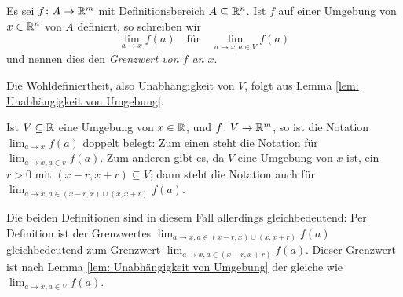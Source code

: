 \documentclass[a4paper,10pt]{article}
\begin{document}
\begin{defi}
 Es sei $f \colon A \to \mathbb{R}^m$ mit Definitionsbereich $A \subseteq \mathbb{R}^n$. Ist $f$ auf einer Umgebung von $x \in \mathbb{R}^n$ von $A$ definiert, so schreiben wir
 \[
  \lim_{a \to x} f(a)
  \quad
  \text{für}
  \quad
  \lim_{a \to x, a \in V} f(a)
 \]
 und nennen dies den \emph{Grenzwert von $f$ an $x$}.
\end{defi}


Die Wohldefiniertheit, also Unabhängigkeit von $V$, folgt aus Lemma \ref{lem: Unabhängigkeit von Umgebung}.


\begin{bem}
 Ist $V \subseteq \mathbb{R}$ eine Umgebung von $x \in \mathbb{R}$, und $f \colon V \to \mathbb{R}^m$, so ist die Notation $\lim_{a \to x} f(a)$ doppelt belegt: Zum einen steht die Notation für $\lim_{a \to x, a \in v} f(a)$. Zum anderen gibt es, da $V$ eine Umgebung von $x$ ist, ein $r > 0$ mit $(x-r,x+r) \subseteq V$; dann steht die Notation auch für $\lim_{a \to x, a \in (x-r,x) \cup (x,x+r)} f(a)$.
 
 Die beiden Definitionen sind in diesem Fall allerdings gleichbedeutend: Per Definition ist der Grenzwertes $\lim_{a \to x, a \in (x-r,x) \cup (x,x+r)} f(a)$ gleichbedeutend zum Grenzwert $\lim_{a \to x, a \in (x-r,x+r)} f(a)$. Dieser Grenzwert ist nach Lemma \ref{lem: Unabhängigkeit von Umgebung} der gleiche wie $\lim_{a \to x, a \in V} f(a)$.
\end{bem}
\end{document}

